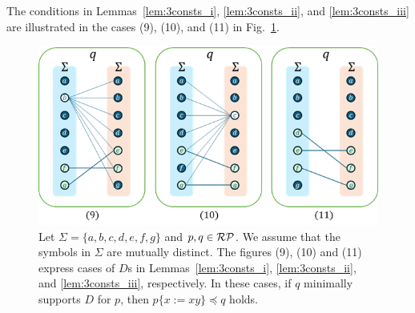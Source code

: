 The conditions in Lemmas~\ref{lem:3consts_i}, \ref{lem:3consts_ii}, and \ref{lem:3consts_iii} are illustrated in the cases (9), (10), and (11) in Fig.~\ref{fig:lem7bigraph}.

\begin{figure}[t]
  \begin{center}
    \includegraphics[scale=0.8]{figs/lem7bigraph.png}
    \caption{Let $\Sigma=\{a,b,c,d,e,f,g\}$ and $p,q \in \mathcal{RP}$. We assume that the symbols in $\Sigma$ are mutually distinct.
    {\color{red} The figures (9), (10) and (11) express cases of $D$s in Lemmas~\ref{lem:3consts_i}, \ref{lem:3consts_ii}, and \ref{lem:3consts_iii}, respectively.}
    {\color{red} In these cases, if $q$ minimally supports $D$ for $p$, }
    then $p \{ x := xy \} \preceq q$ holds.}\label{fig:lem7bigraph}
  \end{center}
\end{figure}


